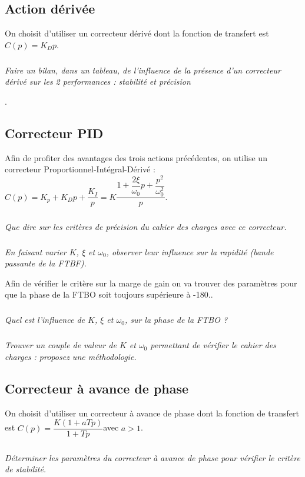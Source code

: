 \documentclass[10pt,fleqn]{article} %
\begin{document}
\begin{multicols}{2}
\subsection*{Action dérivée}
On choisit d’utiliser un correcteur dérivé dont la fonction de transfert est  $C(p)=K_Dp$.
\subparagraph{}
\textit{Faire un bilan, dans un tableau, de l’influence de la présence d’un correcteur dérivé sur les 2 performances : stabilité et précision}
\ifprof
\begin{corrige}
\end{corrige}
\else
\fi.

\subsection*{Correcteur PID}
Afin de profiter des avantages des trois actions précédentes, on utilise un correcteur Proportionnel-Intégral-Dérivé :
$C(p)=K_p+K_D p+\dfrac{K_I}{p}=K\dfrac{1+\dfrac{2\xi}{\omega_0}  p+\dfrac{p^2}{\omega_0^2}}{p}$.
  
\subparagraph{}
\textit{Que dire sur les critères de précision du cahier des charges avec ce correcteur.}
\ifprof
\begin{corrige}
\end{corrige}
\else
\fi

\subparagraph{}
\textit{En faisant varier $K$, $\xi$ et $\omega_0$, observer leur influence sur la rapidité (bande passante de la FTBF).}
\ifprof
\begin{corrige}
\end{corrige}
\else
\fi

Afin de vérifier le critère sur la marge de gain on va trouver des paramètres pour que la phase de la FTBO soit toujours supérieure à -180\degres..
\subparagraph{}
\textit{Quel est l’influence de $K$, $\xi$ et $\omega_0$, sur la phase de la FTBO ? }
\ifprof
\begin{corrige}
\end{corrige}
\else
\fi

\subparagraph{}
\textit{Trouver un couple de valeur de $K$ et $\omega_0$ permettant de vérifier le cahier des charges : proposez une méthodologie.}
\ifprof
\begin{corrige}
\end{corrige}
\else
\fi

\subsection*{Correcteur à avance de phase}
On choisit d’utiliser un correcteur à avance de phase dont la fonction de transfert est 
$C(p)=\dfrac{K (1+aTp)}{1+Tp}$avec $a>1$.
\subparagraph{}
\textit{Déterminer les paramètres du correcteur à avance de phase pour vérifier le critère de stabilité.}
\ifprof
\begin{corrige}
\end{corrige}
\else
\fi


\end{multicols}
\end{document}

